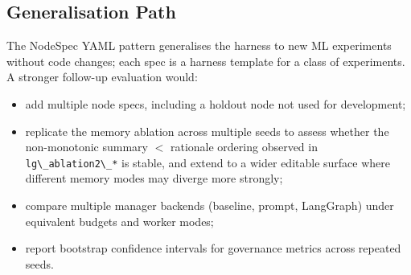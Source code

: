 \subsection{Generalisation Path}\label{generalisation-path}

The NodeSpec YAML pattern generalises the harness to new ML experiments without code changes; each spec is a harness template for a class of experiments. A stronger follow-up evaluation would:

\begin{itemize}
\tightlist
\item
  add multiple node specs, including a holdout node not used for development;
\item
  replicate the memory ablation across multiple seeds to assess whether the non-monotonic summary $<$ rationale ordering observed in \passthrough{\lstinline!lg\_ablation2\_*!} is stable, and extend to a wider editable surface where different memory modes may diverge more strongly;
\item
  compare multiple manager backends (baseline, prompt, LangGraph) under equivalent budgets and worker modes;
\item
  report bootstrap confidence intervals for governance metrics across repeated seeds.
\end{itemize}
